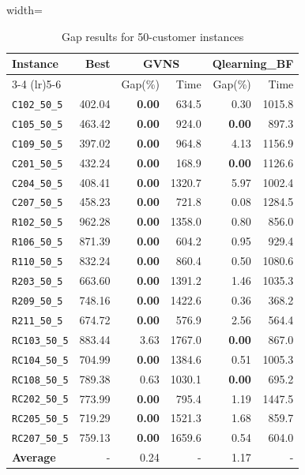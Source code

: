 \begin{table}[ht]
\centering
\small
\setlength{\tabcolsep}{5pt}
\caption{Gap results for 50-customer instances}
\vspace{4mm}
\begin{adjustbox}{width=\textwidth}
\begin{tabular}{l r r r @{\hspace{8pt}} r r @{\hspace{8pt}}}
\toprule
\multirow{2}{*}{Instance} & \multirow{2}{*}{Best} & \multicolumn{2}{c}{GVNS} & \multicolumn{2}{c}{Qlearning\_BF} \\
\cmidrule(lr){3-4} \cmidrule(lr){5-6}
 &  & Gap(\%) & Time & Gap(\%) & Time \\
\midrule
\texttt{C102\_50\_5} & 402.04 & \textbf{0.00} & 634.5 & 0.30 & 1015.8 \\
\texttt{C105\_50\_5} & 463.42 & \textbf{0.00} & 924.0 & \textbf{0.00} & 897.3 \\
\texttt{C109\_50\_5} & 397.02 & \textbf{0.00} & 964.8 & 4.13 & 1156.9 \\
\texttt{C201\_50\_5} & 432.24 & \textbf{0.00} & 168.9 & \textbf{0.00} & 1126.6 \\
\texttt{C204\_50\_5} & 408.41 & \textbf{0.00} & 1320.7 & 5.97 & 1002.4 \\
\texttt{C207\_50\_5} & 458.23 & \textbf{0.00} & 721.8 & 0.08 & 1284.5 \\
\texttt{R102\_50\_5} & 962.28 & \textbf{0.00} & 1358.0 & 0.80 & 856.0 \\
\texttt{R106\_50\_5} & 871.39 & \textbf{0.00} & 604.2 & 0.95 & 929.4 \\
\texttt{R110\_50\_5} & 832.24 & \textbf{0.00} & 860.4 & 0.50 & 1080.6 \\
\texttt{R203\_50\_5} & 663.60 & \textbf{0.00} & 1391.2 & 1.46 & 1035.3 \\
\texttt{R209\_50\_5} & 748.16 & \textbf{0.00} & 1422.6 & 0.36 & 368.2 \\
\texttt{R211\_50\_5} & 674.72 & \textbf{0.00} & 576.9 & 2.56 & 564.4 \\
\texttt{RC103\_50\_5} & 883.44 & 3.63 & 1767.0 & \textbf{0.00} & 867.0 \\
\texttt{RC104\_50\_5} & 704.99 & \textbf{0.00} & 1384.6 & 0.51 & 1005.3 \\
\texttt{RC108\_50\_5} & 789.38 & 0.63 & 1030.1 & \textbf{0.00} & 695.2 \\
\texttt{RC202\_50\_5} & 773.99 & \textbf{0.00} & 795.4 & 1.19 & 1447.5 \\
\texttt{RC205\_50\_5} & 719.29 & \textbf{0.00} & 1521.3 & 1.68 & 859.7 \\
\texttt{RC207\_50\_5} & 759.13 & \textbf{0.00} & 1659.6 & 0.54 & 604.0 \\
\midrule
\textbf{Average} & - & 0.24 & - & 1.17 & - \\
\bottomrule
\end{tabular}
\end{adjustbox}
\end{table}